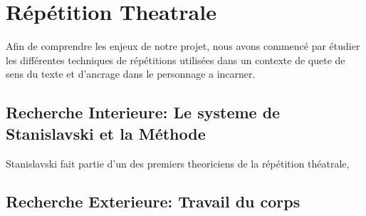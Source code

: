\section{Répétition Theatrale}

Afin de comprendre les enjeux de notre projet, nous avons commencé par étudier les différentes techniques de répétitions utilisées dans un contexte de quete de sens du texte et d'ancrage dans le personnage a incarner. 



\subsection{Recherche Interieure: Le systeme de Stanislavski et la Méthode} 
Stanislavski fait partie d'un des premiers theoriciens de la répétition théatrale,  


\subsection{Recherche Exterieure: Travail du corps}

